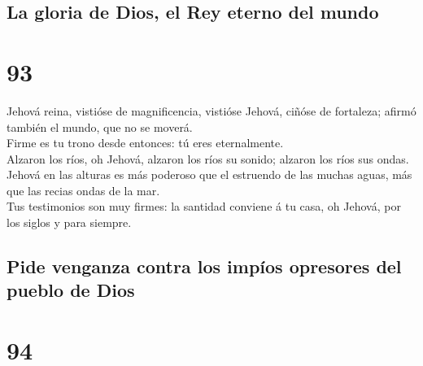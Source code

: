 \hypertarget{la-gloria-de-dios-el-rey-eterno-del-mundo}{%
\subsection{La gloria de Dios, el Rey eterno del
mundo}\label{la-gloria-de-dios-el-rey-eterno-del-mundo}}

\hypertarget{section-19-93}{%
\section{93}\label{section-19-93}}

 Jehová reina, vistióse de magnificencia, vistióse Jehová,
ciñóse de fortaleza; afirmó también el mundo, que no se moverá.\\
 Firme es tu trono desde entonces: tú eres eternalmente.\\
 Alzaron los ríos, oh Jehová, alzaron los ríos su sonido;
alzaron los ríos sus ondas.\\
 Jehová en las alturas es más poderoso que el estruendo de
las muchas aguas, más que las recias ondas de la mar.\\
 Tus testimonios son muy firmes: la santidad conviene á tu
casa, oh Jehová, por los siglos y para siempre.

\hypertarget{pide-venganza-contra-los-impuxedos-opresores-del-pueblo-de-dios}{%
\subsection{Pide venganza contra los impíos opresores del pueblo de
Dios}\label{pide-venganza-contra-los-impuxedos-opresores-del-pueblo-de-dios}}

\hypertarget{section-19-94}{%
\section{94}\label{section-19-94}}

